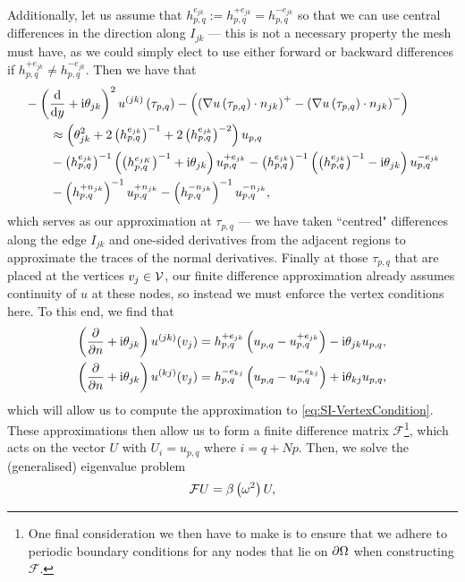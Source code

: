 Additionally, let us assume that $h_{p,q}^{e_{jk}} := h_{p,q}^{+e_{jk}}=h_{p,q}^{-e_{jk}}$ so that we can use central differences in the direction along $I_{jk}$ --- this is not a necessary property the mesh must have, as we could simply elect to use either forward or backward differences if $h_{p,q}^{+e_{jk}} \neq h_{p,q}^{-e_{jk}}$.
Then we have that 
\begin{align*}
	&- \left( \dfrac{\mathrm{d}}{\mathrm{d}y} + \mathrm{i}\theta_{jk} \right)^2u^{(jk)}\left( \tau_{p,q} \right) - \left( \left( \nabla u\left( \tau_{p,q} \right)\cdot n_{jk} \right)^+ - \left( \nabla u\left( \tau_{p,q} \right)\cdot n_{jk} \right)^- \right) \\
	&\qquad \approx \left( \theta_{jk}^2 + 2\left( h_{p,q}^{e_{jk}} \right)^{-1} + 2\left( h_{p,q}^{e_{jk}} \right)^{-2} \right)u_{p,q} \\
	&\qquad - \left( h_{p,q}^{e_{jk}} \right)^{-1}\left(  \left( h_{p,q}^{e_{jK}} \right)^{-1} + \mathrm{i}\theta_{jk}  \right)u_{p,q}^{+e_{jk}}
	- \left( h_{p,q}^{e_{jk}} \right)^{-1}\left(  \left( h_{p,q}^{e_{jk}} \right)^{-1} - \mathrm{i}\theta_{jk}  \right)u_{p,q}^{-e_{jk}} \\
	&\qquad - \left( h_{p,q}^{+n_{jk}} \right)^{-1}u_{p,q}^{+n_{jk}}
	- \left( h_{p,q}^{-n_{jk}} \right)^{-1}u_{p,q}^{-n_{jk}},
\end{align*}
which serves as our approximation at $\tau_{p,q}$ --- we have taken ``centred" differences along the edge $I_{jk}$ and one-sided derivatives from the adjacent regions to approximate the traces of the normal derivatives.
Finally at those $\tau_{p,q}$ that are placed at the vertices $v_j\in\mathcal{V}$, our finite difference approximation already assumes continuity of $u$ at these nodes, so instead we must enforce the vertex conditions here.
To this end, we find that
\begin{align*}
	\left(  \dfrac{\partial }{\partial n} + \mathrm{i}\theta_{jk}  \right) u^{(jk)}(v_j)
	&= h_{p,q}^{+e_{jk}}\left(  u_{p,q} - u_{p,q}^{+e_{jk}}  \right) - \mathrm{i}\theta_{jk}u_{p,q}, \\
	\left(  \dfrac{\partial }{\partial n} + \mathrm{i}\theta_{jk}  \right) u^{(kj)}(v_j)
	&= h_{p,q}^{-e_{kj}}\left(  u_{p,q} - u_{p,q}^{-e_{kj}}  \right) + \mathrm{i}\theta_{kj}u_{p,q},	
\end{align*}
which will allow us to compute the approximation to \eqref{eq:SI-VertexCondition}.
These approximations then allow us to form a finite difference matrix $\mathcal{F}$\footnote{One final consideration we then have to make is to ensure that we adhere to periodic boundary conditions for any nodes that lie on $\partial\Omega$ when constructing $\mathcal{F}$.}, which acts on the vector $U$ with $U_{i} = u_{p,q}$ where $i = q + Np$.
Then, we solve the (generalised) eigenvalue problem
\begin{align} \label{eq:FDM-MatrixSystem}
	\mathcal{F}U = \beta\left( \omega^2 \right)U,
\end{align}
